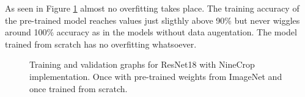 \begin{table}[!h] \centering
{}
\caption{Resnet18 NineCrop implementation with and without pre-training. FINAL (regular) means ResNet18 with the resizing of the image instead of cropping and averaging}
\label{tbl:resnet18-randomnine}
\end{table}

As seen in Figure \ref{fig:resnet18-ninecrop-graph} almost no overfitting takes place. The  training accuracy of the pre-trained model reaches values just sligthly above  90\%  but never wiggles around 100\% accuracy as in the models without data augentation. The model trained from scratch has no overfitting whatsoever.

\begin{figure}[!h]
\centering
\caption{Training and validation graphs for ResNet18 with NineCrop implementation. Once with pre-trained weights from ImageNet and once trained from scratch.}
\label{fig:resnet18-ninecrop-graph}
\end{figure}

